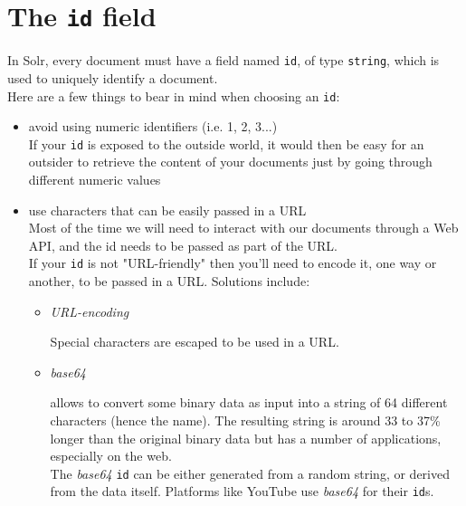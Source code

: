 \section{The \texttt{id} field}   \label{id-field}

In Solr, every document must have a ﬁeld named \texttt{id}, of type \texttt{string}, which is used to uniquely identify a document. \\

Here are a few things to bear in mind when choosing an \texttt{id}:

\begin{itemize}
	\item avoid using numeric identifiers (i.e. 1, 2, 3...) \\
	
	If your \texttt{id} is exposed to the outside world, it would then be easy for an outsider to retrieve the content of your documents just by going through different numeric values \\
	
	
	\item use characters that can be easily passed in a URL \\

	Most of the time we will need to interact with our documents through a Web API, and the id needs to be passed as part of the URL. \\
		
	If your \texttt{id} is not "URL-friendly" then you'll need to encode it, one way or another, to be passed in a URL. Solutions include:
	
	\begin{itemize}
		\item \emph{URL-encoding}
		
		Special characters are escaped to be used in a URL. \\
		
		\item \emph{base64}
	
		allows to convert some binary data as input into a string of 64 different characters (hence the name). The resulting string is around 33 to 37\% longer than the original binary data but has a number of applications, especially on the web. \\
		
		The \emph{base64} \texttt{id} can be either generated from a random string, or derived from the data itself. Platforms like YouTube use \emph{base64} for their \texttt{id}s.
	\end{itemize}
	

	
\end{itemize}




